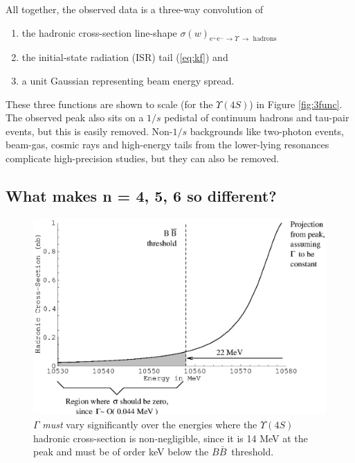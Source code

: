 \documentclass[12pt]{article}
\def\yivs{$\Upsilon(4S)$}
\def\bbar{$B\bar{B}$}
\begin{document}
\noindent \label{page:other_backgrounds} All together, the observed
data is a three-way convolution of
\begin{enumerate}
  \item the hadronic cross-section line-shape
        $\sigma(w)_{\mbox{e$^+$e$^-$} \to \Upsilon\ \to \mbox{ hadrons}}$
  \item the initial-state radiation (ISR) tail (\ref{eq:kf}) and
  \item a unit Gaussian representing beam energy spread.
\end{enumerate}
These three functions are shown to scale (for the \yivs) in Figure
\ref{fig:3func}. The observed peak also sits on a $1/s$ pedistal of
continuum hadrons and tau-pair events, but this is easily removed.
Non-$1/s$ backgrounds like two-photon events, beam-gas, cosmic rays
and high-energy tails from the lower-lying resonances complicate
high-precision studies, but they can also be removed.

\subsection{What makes n = 4, 5, 6 so different?}

\begin{figure}[p]
  \begin{center}
    \includegraphics[width=0.75\linewidth]{bb_thresh.eps}
  \end{center}

  \caption{$\Gamma$ {\it must} vary significantly over the energies
  where the $\Upsilon(4S)$ hadronic cross-section is non-negligible,
  since it is 14 MeV at the peak and must be of order keV below the
  \bbar\ threshold.}

  \label{fig:bb_thresh}
\end{figure}
\end{document}
